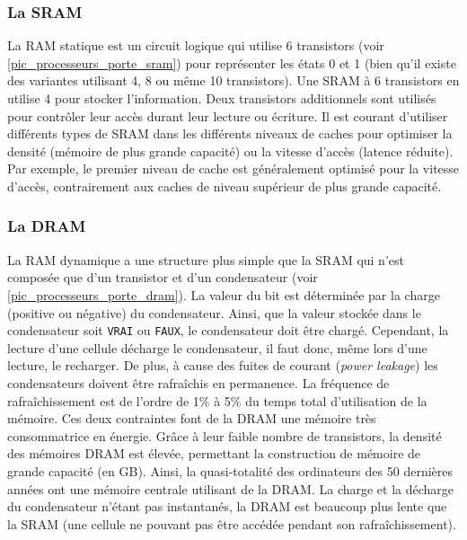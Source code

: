     \subsubsection{La SRAM} 
    
        La RAM statique est un circuit logique qui utilise 6 transistors (voir \autoref{pic_processeurs_porte_sram}) pour représenter les états 0 et 1 (bien qu'il existe des variantes utilisant 4, 8 ou même 10 transistors). Une SRAM à 6 transistors en utilise 4 pour stocker l'information. Deux transistors additionnels sont utilisés pour contrôler leur accès durant leur lecture ou écriture.
        Il est courant d'utiliser différents types de SRAM dans les différents niveaux de caches pour optimiser la densité (mémoire de plus grande capacité) ou la vitesse d'accès (latence réduite). Par exemple, le premier niveau de cache est généralement optimisé pour la vitesse d'accès, contrairement aux caches de niveau supérieur de plus grande capacité.
    
    
    \subsubsection{La DRAM} 
    
        La RAM dynamique a une structure plus simple que la SRAM qui n'est composée que d'un transistor et d'un condensateur (voir \autoref{pic_processeurs_porte_dram}). La valeur du bit est déterminée par la charge (positive ou négative) du condensateur. Ainsi, que la valeur stockée dans le condensateur soit \verb|VRAI| ou \verb|FAUX|, le condensateur doit être chargé. Cependant, la lecture d’une cellule décharge le condensateur, il faut donc, même lors d’une lecture, le recharger. De plus, à cause des fuites de courant (\textit{power leakage}) les condensateurs doivent être rafraîchis en permanence. La fréquence de rafraîchissement est de l'ordre de 1\% à 5\% du temps total d'utilisation de la mémoire. Ces deux contraintes font de la DRAM une mémoire très consommatrice en énergie. Grâce à leur faible nombre de transistors, la densité des mémoires DRAM est élevée, permettant la construction de mémoire de grande capacité (en GB). Ainsi, la quasi-totalité des ordinateurs des 50 dernières années ont une mémoire centrale utilisant de la DRAM. 
        La charge et la décharge du condensateur n’étant pas instantanés, la DRAM est beaucoup plus lente que la SRAM (une cellule ne pouvant pas être accédée pendant son rafraîchissement). 
    
    
